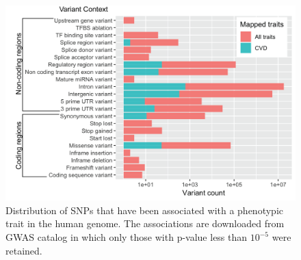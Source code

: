 \documentclass[letter]{bioinfo}
\begin{document}
		\begin{figure}[!tpb]
		\includegraphics[width=1\linewidth]{variant_contexts}
		\caption{Distribution of SNPs that have been associated with a phenotypic trait in the human genome. The associations are downloaded from GWAS catalog \citep{MacArthur:2017:new} in which only those with p-value less than $10^{-5}$ were retained.}
		\label{fig:variant_context}
	\end{figure}
	
\end{document}
